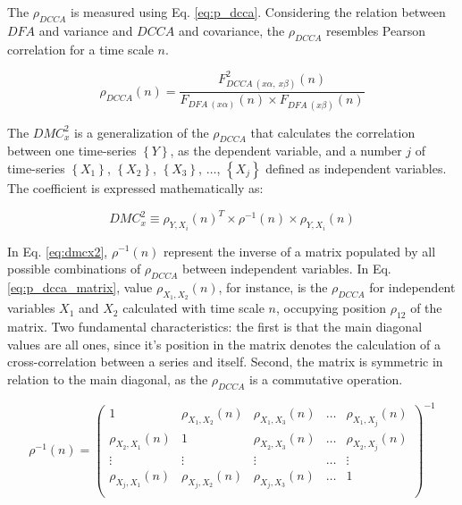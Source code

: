 \documentclass[article]{jss}
\begin{document}
The $\rho_{DCCA}$ is measured using Eq. \ref{eq:p_dcca}. Considering the relation between $DFA$ and variance and $DCCA$ and covariance, the $\rho_{DCCA}$ resembles Pearson correlation for a time scale $n$.

\begin{equation}
  {\rho}_{DCCA}(n) = \frac{F_{DCCA~(x\alpha,~x\beta)}^{2}(n)}
  {F_{DFA~(x\alpha)}(n) \times F_{DFA~(x\beta)}(n)}
  \label{eq:p_dcca}
\end{equation}

The $DMC_x^2$ is a generalization of the $\rho_{DCCA}$ that calculates the correlation between one time-series $\left\lbrace Y \right\rbrace $, as the  dependent variable, and a number $j$ of time-series $\left\lbrace X_{1} \right\rbrace $, $\left\lbrace X_{2} \right\rbrace $, $\left\lbrace X_{3} \right\rbrace $, $\dots $, $\left\lbrace X_{j} \right\rbrace $ defined as independent variables. The coefficient is expressed mathematically as:

\begin{equation}
  {DMC}_{x}^{2}  \equiv \rho_{Y,X_{i}}(n)^{T} \times \rho^{-1}(n) \times \rho_{Y,X_{i}}(n)
  \label{eq:dmcx2}
\end{equation}

In Eq. \ref{eq:dmcx2}, $\rho^{-1}(n)$ represent the inverse of a matrix populated by all possible combinations of $\rho_{DCCA}$ between independent variables. In Eq. \ref{eq:p_dcca_matrix}, value $\rho_{X_{1},X_{2}}(n)$, for instance, is the $\rho_{DCCA}$ for independent variables $X_{1}$ and $X_{2}$ calculated with time scale $n$, occupying position $\rho_{1 2}$ of the matrix. Two fundamental characteristics: the first is that the main diagonal values are all ones, since it's position in the matrix denotes the calculation of a cross-correlation between a series and itself. Second, the matrix is symmetric in relation to the main diagonal, as the $\rho_{DCCA}$ is a commutative operation.

\begin{equation}
  \rho^{-1}(n) = \left(\begin{matrix}
    1                     & \rho_{X_{1},X_{2}}(n) & \rho_{X_{1},X_{3}}(n) & \dots & \rho_{X_{1},X_{j}}(n) \\
    \rho_{X_{2},X_{1}}(n) & 1                     & \rho_{X_{2},X_{3}}(n) & \dots & \rho_{X_{2},X_{j}}(n) \\
    \vdots                & \vdots                & \vdots                & \dots & \vdots                \\
    \rho_{X_{j},X_{1}}(n) & \rho_{X_{j},X_{2}}(n) & \rho_{X_{j},X_{3}}(n) & \dots & 1                     \\
  \end{matrix}\right)^{-1}
  \label{eq:p_dcca_matrix}
\end{equation}
\end{document}

